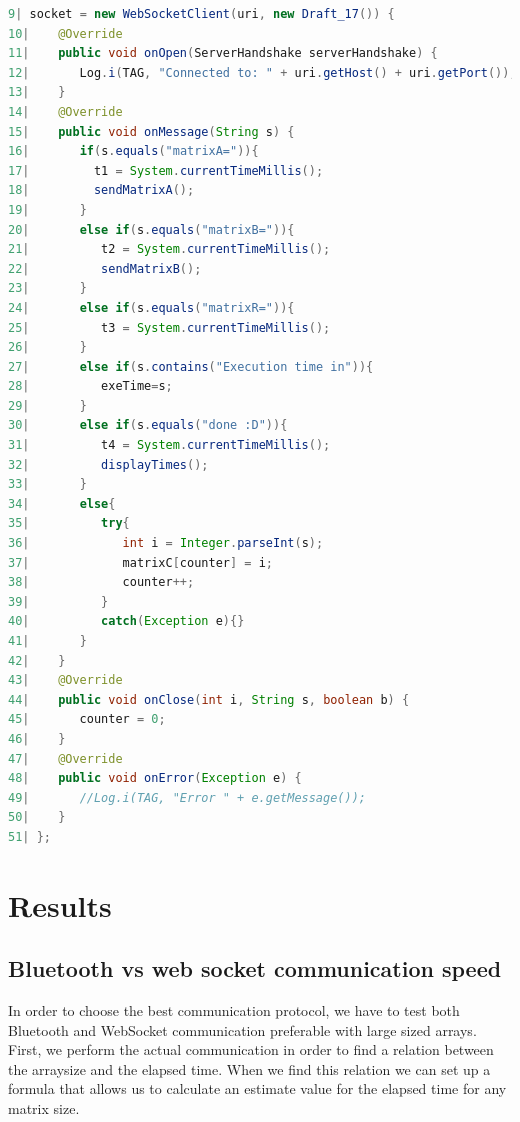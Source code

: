 \documentclass[a4paper, 11pt]{report}
\begin{document}
\begin{lstlisting}[caption={Detailed look at creating the WebSocket client},captionpos=b, label={lst:detailWebSocketClient}, language=java, float=h]
 9| socket = new WebSocketClient(uri, new Draft_17()) {
10|    @Override
11|    public void onOpen(ServerHandshake serverHandshake) {
12|       Log.i(TAG, "Connected to: " + uri.getHost() + uri.getPort());
13|    }
14|    @Override
15|    public void onMessage(String s) {
16|       if(s.equals("matrixA=")){
17|         t1 = System.currentTimeMillis();
18|         sendMatrixA();
19|       }
20|       else if(s.equals("matrixB=")){
21|          t2 = System.currentTimeMillis();
22|          sendMatrixB();
23|       }
24|       else if(s.equals("matrixR=")){
25|          t3 = System.currentTimeMillis();
26|       }
27|       else if(s.contains("Execution time in")){
28|          exeTime=s;
29|       }
30|       else if(s.equals("done :D")){
31|          t4 = System.currentTimeMillis();
32|          displayTimes();
33|       }
34|       else{
35|          try{
36|             int i = Integer.parseInt(s);
37|             matrixC[counter] = i;
38|             counter++;
39|          }
40|          catch(Exception e){}
41|       }
42|    }
43|    @Override
44|    public void onClose(int i, String s, boolean b) {
45|       counter = 0;
46|    }
47|    @Override
48|    public void onError(Exception e) {
49|       //Log.i(TAG, "Error " + e.getMessage());
50|    }
51| };
\end{lstlisting}





\chapter{Results}

	\section{Bluetooth vs web socket communication speed}
In order to choose the best communication protocol, we have to test both Bluetooth and WebSocket communication preferable with large sized arrays. First, we perform the actual communication in order to find a relation between the arraysize and the elapsed time. When we find this relation we can set up a formula that allows us to calculate an estimate value for the elapsed time for any matrix size.
\end{document}
